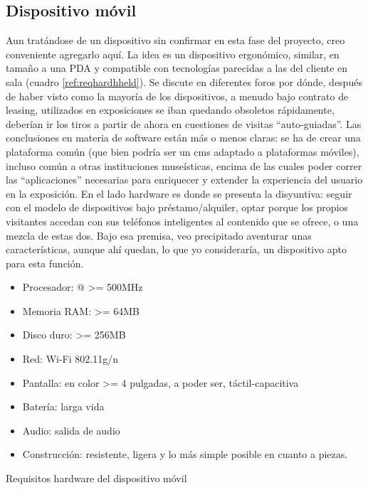 \subsection{Dispositivo móvil}

\par Aun tratándose de un dispositivo sin confirmar en esta fase del proyecto, creo conveniente agregarlo aquí. La idea es un dispositivo ergonómico, similar, en tamaño a una PDA y compatible con tecnologías parecidas a las del cliente en sala (cuadro \ref{ref:reqhardhheld}). Se discute en diferentes foros\cite{references:tatehandheld} por dónde, después de haber visto como la mayoría de los dispositivos, a menudo bajo contrato de leasing, utilizados en exposiciones se iban quedando obsoletos rápidamente, deberían ir los tiros a partir de ahora en cuestiones de visitas ``auto-guiadas''. Las conclusiones en materia de software están más o menos claras: se ha de crear una plataforma común (que bien podría ser un cms adaptado a plataformas móviles), incluso común a otras instituciones museísticas, encima de las cuales poder correr las ``aplicaciones'' necesarias para enriquecer y extender la experiencia del usuario en la exposición. En el lado hardware es donde se presenta la disyuntiva: seguir con el modelo de dispositivos bajo préstamo/alquiler, optar porque los propios visitantes accedan con sus teléfonos inteligentes al contenido que se ofrece, o una mezcla de estas dos. Bajo esa premisa, veo precipitado aventurar unas características, aunque ahí quedan, lo que yo consideraría, un dispositivo apto para esta función.

\begin{table}[h]
  \begin{center}
    \begin{itemize}
     \item Procesador: @ >= 500MHz
     \item Memoria RAM: >= 64MB
     \item Disco duro: >= 256MB
     \item Red: Wi-Fi 802.11g/n
     \item Pantalla: en color >= 4 pulgadas, a poder ser, táctil-capacitiva
     \item Batería: larga vida
     \item Audio: salida de audio
     \item Construcción: resistente, ligera y lo más simple posible en cuanto a piezas.
    \end{itemize}
  \end{center}
  \caption{Requisitos hardware del dispositivo móvil}
  \label{ref:reqhardhheld}
\end{table}


